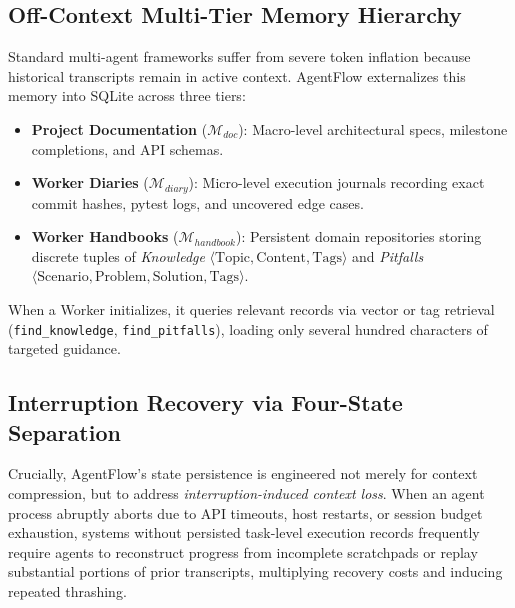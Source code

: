\documentclass[conference]{IEEEtran}
\begin{document}
\subsection{Off-Context Multi-Tier Memory Hierarchy}
Standard multi-agent frameworks suffer from severe token inflation because historical transcripts remain in active context. AgentFlow externalizes this memory into SQLite across three tiers:
\begin{itemize}
    \item \textbf{Project Documentation} ($\mathcal{M}_{doc}$): Macro-level architectural specs, milestone completions, and API schemas.
    \item \textbf{Worker Diaries} ($\mathcal{M}_{diary}$): Micro-level execution journals recording exact commit hashes, pytest logs, and uncovered edge cases.
    \item \textbf{Worker Handbooks} ($\mathcal{M}_{handbook}$): Persistent domain repositories storing discrete tuples of \textit{Knowledge} $\langle \text{Topic}, \text{Content}, \text{Tags} \rangle$ and \textit{Pitfalls} $\langle \text{Scenario}, \text{Problem}, \text{Solution}, \text{Tags} \rangle$.
\end{itemize}
When a Worker initializes, it queries relevant records via vector or tag retrieval (\texttt{find\_knowledge}, \texttt{find\_pitfalls}), loading only several hundred characters of targeted guidance.

\subsection{Interruption Recovery via Four-State Separation}
\label{sec:interruption_recovery}
Crucially, AgentFlow's state persistence is engineered not merely for context compression, but to address \textit{interruption-induced context loss}. When an agent process abruptly aborts due to API timeouts, host restarts, or session budget exhaustion, systems without persisted task-level execution records frequently require agents to reconstruct progress from incomplete scratchpads or replay substantial portions of prior transcripts, multiplying recovery costs and inducing repeated thrashing.
\end{document}
